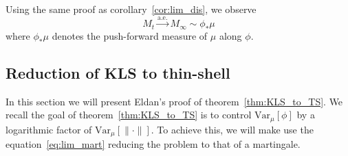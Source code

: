 Using the same proof as corollary~\ref{cor:lim_dis}, we observe 
\begin{equation}\label{eq:lim_mart}
  M_t \xrightarrow{\text{a.e.}} M_\infty \sim \phi_* \mu
\end{equation}
where \(\phi_*\mu\) denotes the push-forward measure of \(\mu\) along \(\phi\).

\subsection{Reduction of KLS to thin-shell}

In this section we will present Eldan's proof \cite{Eldan_notes} of theorem~\ref{thm:KLS_to_TS}.
We recall the goal of theorem~\ref{thm:KLS_to_TS} is to control \(\text{Var}_\mu[\phi]\) by 
a logarithmic factor of \(\text{Var}_\mu[\|\cdot\|]\). To achieve this, we will make use the 
equation~\ref{eq:lim_mart} reducing the problem to that of a martingale.